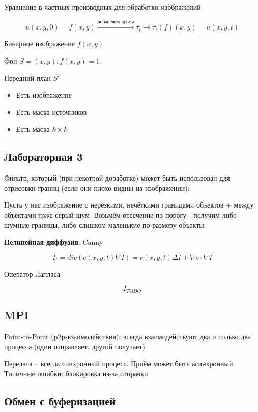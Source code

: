 \documentclass[main.tex]{subfiles}
\begin{document}

Уравнение в частных производных для обработки изображений

\[ u(x, y, 0) = f(x, y) \overset{\text{добавляем время}}\to \boxed{\tau_t } \to \tau_t (f) (x, y) = u(x, y, t) \]

Бинарное изображение $ f(x, y) $

Фон $ S = { (x, y): f(x, y) = 1 } $

Передний план $ S' $

\begin{itemize}[noitemsep]
	\item Есть изображение
	\item Есть маска источников
	\item Есть маска $ k \times k $
\end{itemize}

\subsection{Лабораторная 3}

Фильтр, который (при некотрой доработке) может быть использован для отрисовки границ (если они плохо видны на изображении):

Пусть у нас изображение с нерезкими, нечёткими границами объектов + между объектами тоже серый шум.
Возьмём отсечение по порогу - получим либо шумные границы, либо слишком маленькие по размеру объекты.

\textbf{Нелинейная диффузия}: Canny

\[ I_t = div(c(x,y,t) \nabla I) = c(x,y,t) \Delta I + \nabla c \cdot \nabla I \]

Оператор Лапласа

\[ I_{TODO} \]

\subsection{MPI}

Point-to-Point (p2p-взаимодействия): всегда взаимодействуют два и только два процесса (один отправляет, другой получает)

Передача -- всегда синхронный процесс.
Приём может быть асинхронный. \\

Типичные ошибки: блокировка из-за отправки 

\subsection{Обмен с буферизацией}
\end{document}
